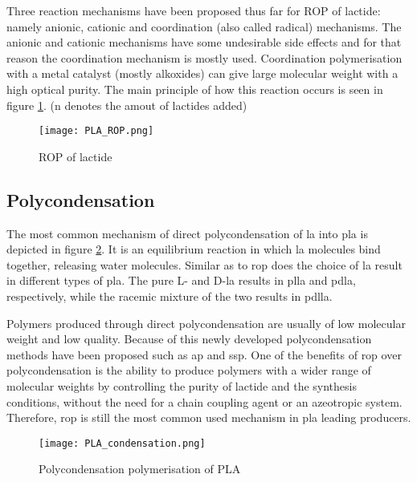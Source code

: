Three reaction mechanisms have been proposed thus far for ROP of lactide: namely anionic, cationic and coordination (also called radical) mechanisms. The anionic and cationic mechanisms have some undesirable side effects and for that reason the coordination mechanism is mostly used. 
Coordination polymerisation with a metal catalyst (mostly alkoxides) can give large molecular weight with a high optical purity. The main principle of how this reaction occurs is seen in figure \ref{fig:PLA_ROP}. (n denotes the amout of lactides added)

\begin{figure}[ht]
    \centering
    \texttt{[image: PLA\_ROP.png]}
    \caption{ROP of lactide}
    \label{fig:PLA_ROP}
\end{figure}

\subsection{Polycondensation}

The most common mechanism of direct polycondensation of \gls{la} into \gls{pla} is depicted in figure \ref{fig:PLA_condensation}. It is an equilibrium reaction in which \gls{la} molecules bind together, releasing water molecules. Similar as to \gls{rop} does the choice of \gls{la} result in different types of \gls{pla}. 
The pure L- and D-\gls{la} results in \gls{plla} and \gls{pdla}, respectively, while the racemic mixture of the two results in \gls{pdlla}. 

Polymers produced through direct polycondensation are usually of low molecular weight and low quality. Because of this newly developed polycondensation methods have been proposed such as \gls{ap} and \gls{ssp}. One of the benefits of \gls{rop} over polycondensation is the ability to produce polymers with a wider range of molecular weights by controlling the purity of lactide and the synthesis conditions, without the need for a chain coupling agent or an azeotropic system. 
Therefore, \gls{rop} is still the most common used mechanism in \gls{pla} leading producers.

\begin{figure}[ht]
    \centering
    \texttt{[image: PLA\_condensation.png]}
    \caption{Polycondensation polymerisation of PLA}
    \label{fig:PLA_condensation}
\end{figure}
